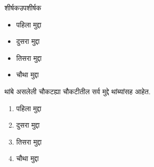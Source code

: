 \begin{frame}{शीर्षक}{उपशीर्षक}
  \begin{itemize}
  \item पहिला मुद्दा
  \item दुसरा मुद्दा
  \item तिसरा मुद्दा
  \item चौथा मुद्दा
  \end{itemize}
\end{frame}
\begin{frame}{थांबे असलेली चौकट}{ह्या चौकटीतील सर्व मुद्दे थांब्यांसह आहेत.}
  \begin{enumerate}
  \item<+-> पहिला मुद्दा
  \item<+-> दुसरा मुद्दा
  \item<+-> तिसरा मुद्दा
  \item<+-> चौथा मुद्दा
  \end{enumerate}
\end{frame}
